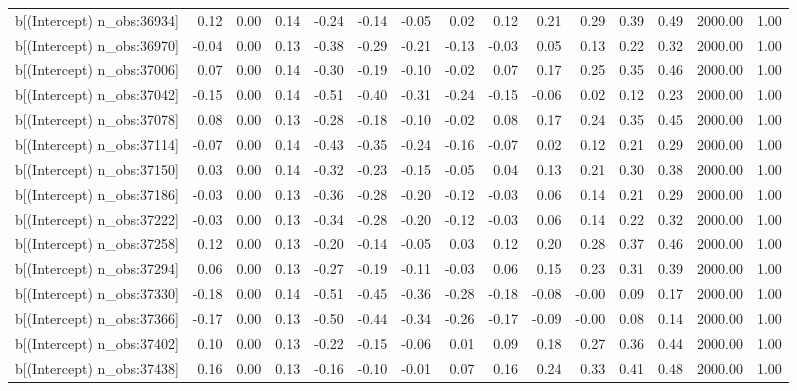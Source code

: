 \begin{table}[ht]
\begin{tabular}{rrrrrrrrrrrrrrr}
  b[(Intercept) n\_obs:36934] & 0.12 & 0.00 & 0.14 & -0.24 & -0.14 & -0.05 & 0.02 & 0.12 & 0.21 & 0.29 & 0.39 & 0.49 & 2000.00 & 1.00 \\ 
  b[(Intercept) n\_obs:36970] & -0.04 & 0.00 & 0.13 & -0.38 & -0.29 & -0.21 & -0.13 & -0.03 & 0.05 & 0.13 & 0.22 & 0.32 & 2000.00 & 1.00 \\ 
  b[(Intercept) n\_obs:37006] & 0.07 & 0.00 & 0.14 & -0.30 & -0.19 & -0.10 & -0.02 & 0.07 & 0.17 & 0.25 & 0.35 & 0.46 & 2000.00 & 1.00 \\ 
  b[(Intercept) n\_obs:37042] & -0.15 & 0.00 & 0.14 & -0.51 & -0.40 & -0.31 & -0.24 & -0.15 & -0.06 & 0.02 & 0.12 & 0.23 & 2000.00 & 1.00 \\ 
  b[(Intercept) n\_obs:37078] & 0.08 & 0.00 & 0.13 & -0.28 & -0.18 & -0.10 & -0.02 & 0.08 & 0.17 & 0.24 & 0.35 & 0.45 & 2000.00 & 1.00 \\ 
  b[(Intercept) n\_obs:37114] & -0.07 & 0.00 & 0.14 & -0.43 & -0.35 & -0.24 & -0.16 & -0.07 & 0.02 & 0.12 & 0.21 & 0.29 & 2000.00 & 1.00 \\ 
  b[(Intercept) n\_obs:37150] & 0.03 & 0.00 & 0.14 & -0.32 & -0.23 & -0.15 & -0.05 & 0.04 & 0.13 & 0.21 & 0.30 & 0.38 & 2000.00 & 1.00 \\ 
  b[(Intercept) n\_obs:37186] & -0.03 & 0.00 & 0.13 & -0.36 & -0.28 & -0.20 & -0.12 & -0.03 & 0.06 & 0.14 & 0.21 & 0.29 & 2000.00 & 1.00 \\ 
  b[(Intercept) n\_obs:37222] & -0.03 & 0.00 & 0.13 & -0.34 & -0.28 & -0.20 & -0.12 & -0.03 & 0.06 & 0.14 & 0.22 & 0.32 & 2000.00 & 1.00 \\ 
  b[(Intercept) n\_obs:37258] & 0.12 & 0.00 & 0.13 & -0.20 & -0.14 & -0.05 & 0.03 & 0.12 & 0.20 & 0.28 & 0.37 & 0.46 & 2000.00 & 1.00 \\ 
  b[(Intercept) n\_obs:37294] & 0.06 & 0.00 & 0.13 & -0.27 & -0.19 & -0.11 & -0.03 & 0.06 & 0.15 & 0.23 & 0.31 & 0.39 & 2000.00 & 1.00 \\ 
  b[(Intercept) n\_obs:37330] & -0.18 & 0.00 & 0.14 & -0.51 & -0.45 & -0.36 & -0.28 & -0.18 & -0.08 & -0.00 & 0.09 & 0.17 & 2000.00 & 1.00 \\ 
  b[(Intercept) n\_obs:37366] & -0.17 & 0.00 & 0.13 & -0.50 & -0.44 & -0.34 & -0.26 & -0.17 & -0.09 & -0.00 & 0.08 & 0.14 & 2000.00 & 1.00 \\ 
  b[(Intercept) n\_obs:37402] & 0.10 & 0.00 & 0.13 & -0.22 & -0.15 & -0.06 & 0.01 & 0.09 & 0.18 & 0.27 & 0.36 & 0.44 & 2000.00 & 1.00 \\ 
  b[(Intercept) n\_obs:37438] & 0.16 & 0.00 & 0.13 & -0.16 & -0.10 & -0.01 & 0.07 & 0.16 & 0.24 & 0.33 & 0.41 & 0.48 & 2000.00 & 1.00 \\ 

\end{tabular}
\end{table}

